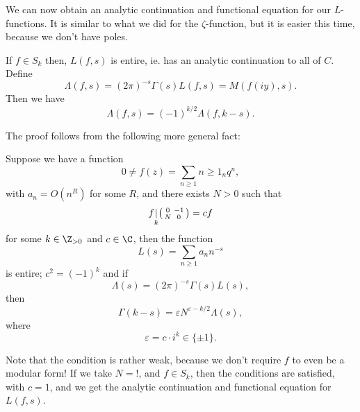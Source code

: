 \documentclass[a4paper]{article}
\begin{document}
We can now obtain an analytic continuation and functional equation for our $L$-functions. It is similar to what we did for the $\zeta$-function, but it is easier this time, because we don't have poles.
\begin{thm}
  If $f \in S_k$ then, $L(f, s)$ is entire, ie. has an analytic continuation to all of $C$. Define
  \[
    \Lambda(f, s) = (2\pi)^{-s} \Gamma(s) L(f, s) = M(f(iy), s).
  \]
  Then we have
  \[
    \Lambda(f, s) = (-1)^{k/2} \Lambda(f, k - s).
  \]
\end{thm}

The proof follows from the following more general fact:
\begin{thm}
  Suppose we have a function
  \[
    0 \not= f(z) = \sum_{n \geq 1}n \geq 1_n q^n,
  \]
  with $a_n = O(n^R)$ for some $R$, and there exists $N > 0$ such that
  \[
    f\underset{k}{|}
    \begin{psmallmatrix}
      0 & -1\\
      N & 0
    \end{psmallmatrix} = cf
  \]
  for some $k \in \Z_{> 0}$ and $c \in \C$, then the function
  \[
    L(s) = \sum_{n \geq 1} a_n n^{-s}
  \]
  is entire; $c^2 = (-1)^k$ and if
  \[
    \Lambda(s) = (2\pi)^{-s} \Gamma(s) L(s),
  \]
  then
  \[
    \Gamma(k - s) = \varepsilon N^{\varepsilon - k/2} \Lambda(s),
  \]
  where
  \[
    \varepsilon = c \cdot i^k \in \{\pm 1\}.
  \]
\end{thm}
Note that the condition is rather weak, because we don't require $f$ to even be a modular form! If we take $N = !$, and $f \in S_k$, then the conditions are satisfied, with $c = 1$, and we get the analytic continuation and functional equation for $L(f, s)$.
\end{document}
